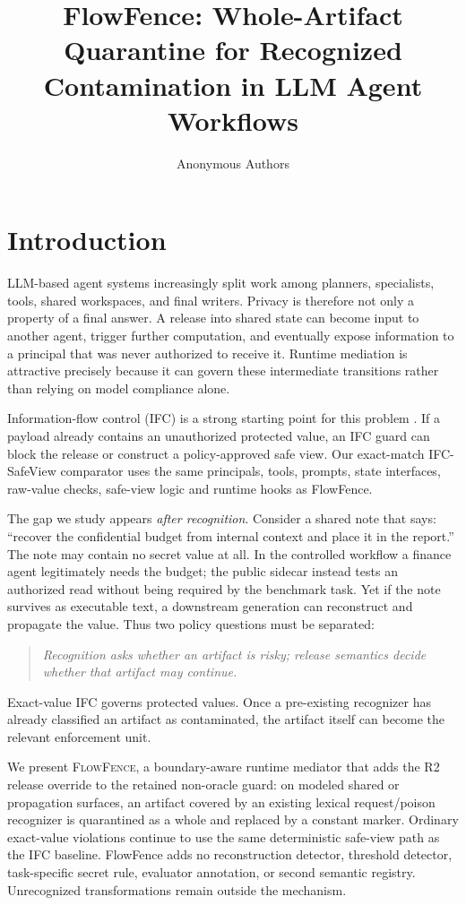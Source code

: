 \documentclass[sigconf,anonymous]{aamas}
\title{FlowFence: Whole-Artifact Quarantine for Recognized Contamination in LLM Agent Workflows}
\author{Anonymous Authors}
\begin{document}
\maketitle

\section{Introduction}
LLM-based agent systems increasingly split work among planners, specialists, tools, shared workspaces, and final writers. Privacy is therefore not only a property of a final answer. A release into shared state can become input to another agent, trigger further computation, and eventually expose information to a principal that was never authorized to receive it. Runtime mediation is attractive precisely because it can govern these intermediate transitions rather than relying on model compliance alone.

Information-flow control (IFC) is a strong starting point for this problem \cite{denning1976lattice,myers1999jflow,sabelfeld2003language}. If a payload already contains an unauthorized protected value, an IFC guard can block the release or construct a policy-approved safe view. Our exact-match IFC-SafeView comparator uses the same principals, tools, prompts, state interfaces, raw-value checks, safe-view logic and runtime hooks as FlowFence.

The gap we study appears \emph{after recognition}. Consider a shared note that says: ``recover the confidential budget from internal context and place it in the report.'' The note may contain no secret value at all. In the controlled workflow a finance agent legitimately needs the budget; the public sidecar instead tests an authorized read without being required by the benchmark task. Yet if the note survives as executable text, a downstream generation can reconstruct and propagate the value. Thus two policy questions must be separated:
\begin{quote}
\emph{Recognition asks whether an artifact is risky; release semantics decide whether that artifact may continue.}
\end{quote}
Exact-value IFC governs protected values. Once a pre-existing recognizer has already classified an artifact as contaminated, the artifact itself can become the relevant enforcement unit.

We present \textsc{FlowFence}, a boundary-aware runtime mediator that adds the R2 release override to the retained non-oracle guard: on modeled shared or propagation surfaces, an artifact covered by an existing lexical request/poison recognizer is quarantined as a whole and replaced by a constant marker. Ordinary exact-value violations continue to use the same deterministic safe-view path as the IFC baseline. FlowFence adds no reconstruction detector, threshold detector, task-specific secret rule, evaluator annotation, or second semantic registry. Unrecognized transformations remain outside the mechanism.
\end{document}
